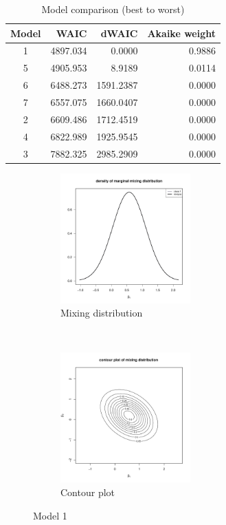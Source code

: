 \documentclass[10pt,a4paper]{article}
\begin{document}
	\begin{table}[h]
		\centering
		\begin{tabular}{c|r|r|r}
			Model & WAIC & dWAIC & Akaike weight \\ \hline
			1 & 4897.034 & 0.0000 	 & 0.9886 \\ \hline
			5 & 4905.953 & 8.9189    & 0.0114 \\ \hline
			6 & 6488.273 & 1591.2387 & 0.0000 \\ \hline
			7 & 6557.075 & 1660.0407 & 0.0000 \\ \hline
			2 & 6609.486 & 1712.4519 & 0.0000 \\ \hline
			4 & 6822.989 & 1925.9545 & 0.0000 \\ \hline
			3 & 7882.325 & 2985.2909 & 0.0000 \\ 
		\end{tabular}
		\caption{Model comparison (best to worst)}
	\end{table}
	\begin{figure}[h!]
		\centering
		\begin{subfigure}[t]{0.5\textwidth}
			\centering
				\includegraphics[width=5cm]{results/train_C1/marginal.pdf}
			\caption{Mixing distribution}
		\end{subfigure}%
		~ 
		\begin{subfigure}[t]{0.5\textwidth}
			\centering
				\includegraphics[width=5cm]{results/train_C1/contour.pdf}
			\caption{Contour plot}
		\end{subfigure}
		\caption{Model 1}
	\end{figure}
\end{document}
